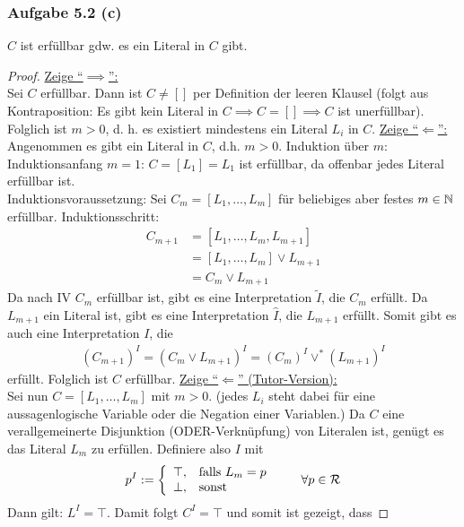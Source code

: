 \subsubsection{Aufgabe 5.2 (c)}
$C$ ist erfüllbar gdw. es ein Literal in $C$ gibt.

\begin{proof}
	\underline{Zeige ``$\implies$'':}\\
	Sei $C$ erfüllbar. 
	Dann ist $C\neq[]$ per Definition der leeren Klausel 
	(folgt aus Kontraposition: Es gibt kein Literal in $C\implies C=[]\implies C$ ist unerfüllbar). 	
	Folglich ist $m>0$, d. h. es existiert mindestens ein Literal $L_i$ in $C$.\nl
	\underline{Zeige ``$\Longleftarrow$'':}\\
	Angenommen es gibt ein Literal in $C$, d.h. $m>0$.
	Induktion über $m$:\\
	Induktionsanfang $m=1$: $C=[L_1]=L_1$ ist erfüllbar, da offenbar jedes Literal erfüllbar ist.\\
	Induktionsvoraussetzung: Sei $C_m=[L_1,\ldots,L_m]$ für beliebiges aber festes $m\in\mathbb{N}$ erfüllbar.
	Induktionsschritt: 
	\begin{align*}
		C_{m+1}
		&=[L_1,\ldots,L_m,L_{m+1}]\\
		&=[L_1,\ldots,L_m]\vee L_{m+1}\\
		&= C_{m}\vee L_{m+1}
	\end{align*}
	Da nach IV $C_m$ erfüllbar ist, gibt es eine Interpretation $\tilde{I}$, die $C_m$ erfüllt. 
	Da $L_{m+1}$ ein Literal ist, gibt es eine Interpretation $\hat{I}$, die $L_{m+1}$ erfüllt. 
	Somit gibt es auch eine Interpretation $I$, die 
	\begin{align*}
		(C_{m+1})^I=(C_{m}\vee L_{m+1})^I=(C_{m})^I\vee^\ast (L_{m+1})^I
	\end{align*}
	erfüllt. Folglich ist $C$ erfüllbar.\nl
	\underline{Zeige ``$\Longleftarrow$'' (Tutor-Version):}\\
	Sei nun $C=[L_1,\ldots,L_m]$ mit $m>0$. 
	(jedes $L_i$ steht dabei für eine aussagenlogische Variable oder die Negation einer Variablen.)
	Da $C$ eine verallgemeinerte Disjunktion (ODER-Verknüpfung) von Literalen ist, genügt es das Literal $L_m$ zu erfüllen. 
	Definiere also $I$ mit
	\begin{align*}
		p^I:=\left\lbrace\begin{array}{cl}
			\top,&\text{falls } L_m=p\\		
			\bot,&\text{sonst }
		\end{array}\right.\qquad\forall p\in\mathcal{R}
	\end{align*}
	Dann gilt: $L^I=\top$. Damit folgt $C^I=\top$ und somit ist gezeigt, dass
\end{proof}
